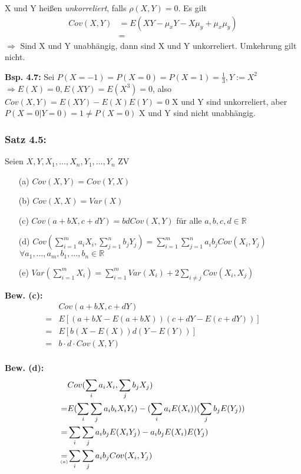 \documentclass[a4paper,11pt]{article}
\begin{document}
\vspace{6pt}
\noindent X und Y heißen \textit{unkorreliert}, falls $\rho(X,Y)=0$.
\newline Es gilt 
\begin{align*}
Cov(X,Y) &= E(XY-\mu_xY-X\mu_y+\mu_x\mu_y)\\
&= 
\end{align*}
$\Rightarrow$ Sind X und Y unabhängig, dann sind X und Y unkorreliert. Umkehrung gilt nicht.

\vspace{6pt}
\noindent\textbf{Bsp. 4.7:} Sei $P(X=-1)=P(X=0)=P(X=1)=\frac{1}{3}, Y:=X^2$
\newline $\Rightarrow E(X)=0,E(XY)=E(X^3)=0$, also
\newline $Cov(X,Y)=E(XY)-E(X)E(Y)=0$
\newline X und Y sind unkorreliert, aber
\newline $P(X=0|Y=0)=1 \neq P(X=0)$
\newline X und Y sind nicht unabhängig.

\subsubsection{Satz 4.5:} Seien $X,Y,X_1,\dots,X_n,Y_1,\dots,Y_n$ ZV
\begin{itemize}
    \item[(a)] $Cov(X,Y) = Cov(Y,X)$
    \item[(b)] $Cov(X,X) = Var(X)$
    \item[(c)] $Cov(a+bX,c+dY) = bdCov(X,Y)$ für alle $a,b,c,d\in\mathbb{R}$
    \item[(d)] $Cov(\sum_{i=1}^{m}a_iX_i,\sum_{j=1}^{n}b_jY_j) = \sum_{i=1}^{m}\sum_{j=1}^{n}a_ib_jCov(X_i,Y_j)$ 
        $\hspace{1pt} \forall a_1,\dots,a_m,b_1,\dots,b_n\in\mathbb{R}$
    \item[(e)] $Var(\sum_{i=1}^{m}X_i)=\sum_{i=1}^{m}Var(X_i)+2\sum_{i\neq j}Cov(X_i,X_j)$
\end{itemize} 

\noindent\textbf{Bew. (c):}
\begin{align*}
& Cov(a+bX,c+dY)\\
=&E[(a+bX-E(a+bX))(c+dY-E(c+dY))]\\
=&E[b(X-E(X))d(Y-E(Y))]\\
=&b\cdot d\cdot Cov(X,Y)\\
\end{align*}

\noindent\textbf{Bew. (d):}
\begin{align*}
    & Cov(\sum_{i}a_iX_i,\sum_{j}b_jX_j)\\
    =& E(\sum_{i}\sum_{j}a_ib_iX_iY_i) - (\sum_{i}a_iE(X_i))(\sum_{j}b_jE(Y_j))\\
    =& \sum_{i}\sum_{j}a_ib_jE(X_iY_j) - a_ib_jE(X_i)E(Y_j)\\
    \underset{\mathclap{\scriptscriptstyle (a)}}{=}& \sum_{i}\sum_{j}a_ib_jCov(X_i,Y_j)\\
\end{align*}
\end{document}
